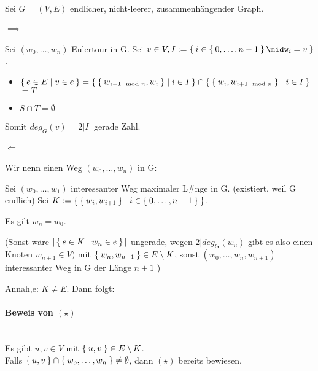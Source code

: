 \documentclass{../../meta/tudscript}
\begin{document}
Sei $G = (V, E)$ endlicher, nicht-leerer, zusammenhängender Graph.

\paragraph{$\implies$}
    Sei $(w_0, \ldots, w_n)$ Eulertour in G. Sei $v \in V, I := \Set{i \in \Set{0, \ldots, n-1} \midw_i = v}$.
\begin{itemize}
    \item $\Set{e \in E \mid v \in e} = \Set{\Set{w_{i - 1 \mod n}, w_i }\mid i \in I} \cap \Set{\Set{w_{i}, w_{i + 1 \mod n } }\mid i \in I}$ $= T$
    \item $S \cap T = \emptyset$
\end{itemize}
Somit $deg_G (v) = 2 |I|$ gerade Zahl.
\paragraph{$\Leftarrow$}
Wir nenn einen Weg $(w_0, \ldots, w_n)$ in G:

Sei $(w_0, \ldots, w_1)$ interessanter Weg maximaler L#nge in G. (existiert, weil G endlich)
Sei $K := \Set{\Set{w_i, w_{i + 1}} \mid i \in \Set{0, \ldots, n - 1}}$.

Es gilt $w_n = w_0$.


(Sonst wäre $|\Set{e \in K \mid w_n \in e}|$ ungerade, wegen $2|deg_G (w_n)$ gibt es also einen Knoten $w_{n+1} \in V)$ mit $\Set{w_n, w_{n+1}} \in E \setminus K$, sonst
$(w_0, \ldots, w_n, w_{n+1})$ interessanter Weg in G der Länge $n+1$ \lightning) 


Annah,e: $K \neq E$. Dann folgt:

\paragraph{Beweis von $(\star)$} \\
Es gibt $u, v \in V$ mit $\Set{u, v} \in E \setminus K$. \\
Falls $\Set{u, v} \cap \Set{w_o, \ldots, w_n} \neq \emptyset$, dann $(\star)$ bereits bewiesen.
\end{document}

